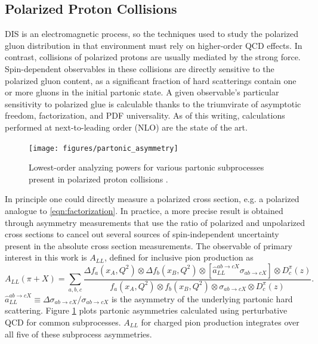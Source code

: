 \subsection{Polarized Proton Collisions}

DIS is an electromagnetic process, so the techniques used to study the polarized gluon distribution in that environment must rely on higher-order QCD effects. In contrast, collisions of polarized protons are usually mediated by the strong force. Spin-dependent observables in these collisions are  directly sensitive to the polarized gluon content, as a significant fraction of hard scatterings contain one or more gluons in the initial partonic state. A given observable's particular sensitivity to polarized glue is calculable thanks to the triumvirate of asymptotic freedom, factorization, and PDF universality.  As of this writing, calculations performed at next-to-leading order (NLO) are the state of the art.

\begin{figure}\begin{center}
  \texttt{[image: figures/partonic\_asymmetry]}
  \caption{Lowest-order analyzing powers for various partonic subprocesses
  present in polarized proton collisions \cite{Bunce:2000uv}.}
  \label{fig:partonic-asymmetries}
\end{center}\end{figure}

In principle one could directly measure a polarized cross section, e.g. a polarized analogue to \ref{eqn:factorization}.  In practice, a more precise result is obtained through asymmetry measurements that use the ratio of polarized and unpolarized cross sections to cancel out several sources of spin-independent uncertainty present in the absolute cross section measurements.  The observable of primary interest in this work is \(A_{LL}\), defined for inclusive pion production as
%
\begin{equation}
  A_{LL}(\pi + X) = \sum_{a,b,c} \frac{\Delta f_a(x_A, Q^2) \otimes \Delta f_b(x_B, Q^2) \otimes \left[ \hat{a}_{LL}^{ab \rightarrow cX} \sigma_{ab \rightarrow cX} \right] \otimes D_c^{\pi}(z)}{f_a(x_A, Q^2) \otimes f_b(x_B, Q^2) \otimes \sigma_{ab \rightarrow cX} \otimes D_c^{\pi}(z)}.
\end{equation}
%
\(\hat{a}_{LL}^{ab \rightarrow cX} \equiv \Delta \sigma_{ab \rightarrow cX} / \sigma_{ab \rightarrow cX}\) is the asymmetry of the underlying partonic hard scattering.  Figure \ref{fig:partonic-asymmetries} plots partonic asymmetries calculated using perturbative QCD for common subprocesses.  \(A_{LL}\) for charged pion production integrates over all five of these subprocess asymmetries.

